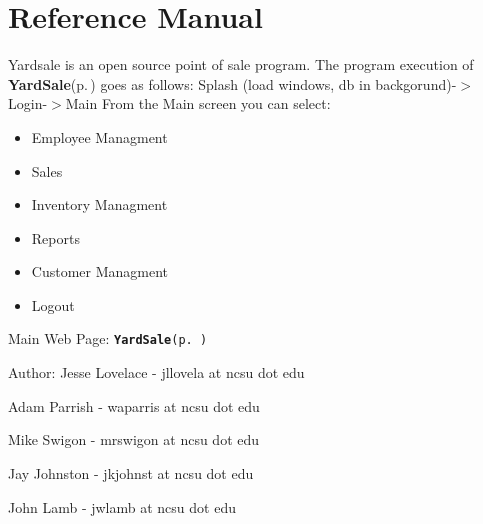 \section*{Reference Manual}

Yardsale is an open source point of sale program. The program execution of {\bf Yard\-Sale}{\rm (p.\,\pageref{classYardSale})} goes as follows: Splash (load windows, db in backgorund)-$>$Login-$>$Main From the Main screen you can select:  \begin{itemize}
\item Employee Managment 
\item Sales 
\item Inventory Managment 
\item Reports \item Customer Managment \item Logout \end{itemize}


Main Web Page: {\tt {\bf Yard\-Sale}{\rm (p.\,\pageref{classYardSale})}} \begin{Desc}
\item[Author:]Jesse Lovelace - jllovela at ncsu dot edu 

Adam Parrish - waparris at ncsu dot edu 

Mike Swigon - mrswigon at ncsu dot edu 

Jay Johnston - jkjohnst at ncsu dot edu 

John Lamb - jwlamb at ncsu dot edu \end{Desc}

